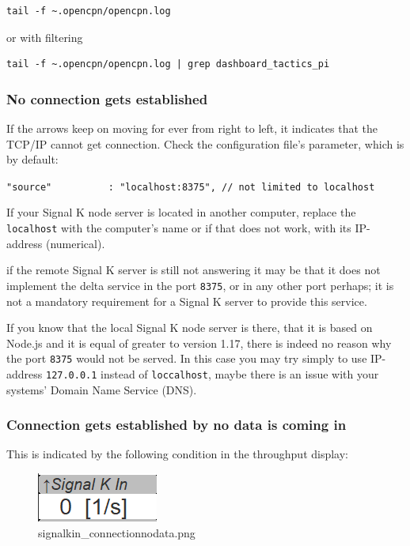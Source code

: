 \documentclass[11pt]{article}
\begin{document}
\begin{verbatim}
tail -f ~.opencpn/opencpn.log
\end{verbatim}

or with filtering

\begin{verbatim}
tail -f ~.opencpn/opencpn.log | grep dashboard_tactics_pi
\end{verbatim}

    \hypertarget{no-connection-gets-established}{%
\subsubsection{No connection gets
established}\label{no-connection-gets-established}}

    If the arrows keep on moving for ever from right to left, it indicates
that the TCP/IP cannot get connection. Check the configuration file's
parameter, which is by default:

    \texttt{"source"\ \ \ \ \ \ \ \ \ \ :\ "localhost:8375",\ //\ not\ limited\ to\ localhost}

    If your Signal K node server is located in another computer, replace the
\texttt{localhost} with the computer's name or if that does not work,
with its IP-address (numerical).

    if the remote Signal K server is still not answering it may be that it
does not implement the delta service in the port \texttt{8375}, or in
any other port perhaps; it is not a mandatory requirement for a Signal K
server to provide this service.

    If you know that the local Signal K node server is there, that it is
based on Node.js and it is equal of greater to version 1.17, there is
indeed no reason why the port \texttt{8375} would not be served. In this
case you may try simply to use IP-address \texttt{127.0.0.1} instead of
\texttt{loccalhost}, maybe there is an issue with your systems' Domain
Name Service (DNS).

    \hypertarget{connection-gets-established-by-no-data-is-coming-in}{%
\subsubsection{Connection gets established by no data is coming
in}\label{connection-gets-established-by-no-data-is-coming-in}}

    This is indicated by the following condition in the throughput display:

    \begin{figure}
\centering
\includegraphics{signalkin_connectionnodata.png}
\caption{signalkin\_connectionnodata.png}
\end{figure}
\end{document}
